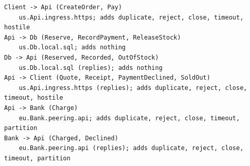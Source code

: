 \begin{lstlisting}[language={},basicstyle=\ttfamily\footnotesize,breaklines=true]
Client -> Api (CreateOrder, Pay)
    us.Api.ingress.https; adds duplicate, reject, close, timeout, hostile
Api -> Db (Reserve, RecordPayment, ReleaseStock)
    us.Db.local.sql; adds nothing
Db -> Api (Reserved, Recorded, OutOfStock)
    us.Db.local.sql (replies); adds nothing
Api -> Client (Quote, Receipt, PaymentDeclined, SoldOut)
    us.Api.ingress.https (replies); adds duplicate, reject, close, timeout, hostile
Api -> Bank (Charge)
    eu.Bank.peering.api; adds duplicate, reject, close, timeout, partition
Bank -> Api (Charged, Declined)
    eu.Bank.peering.api (replies); adds duplicate, reject, close, timeout, partition
\end{lstlisting}
